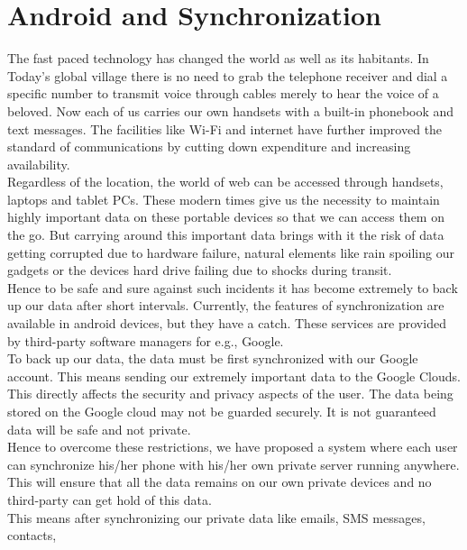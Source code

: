 \section{Android and Synchronization}
\hspace*{0.82cm}The fast paced technology has changed the world as well as its habitants. In Today’s
global village there is no need to grab the telephone receiver and dial a specific number to
transmit voice through cables merely to hear the voice of a beloved. Now each of us carries
our own handsets with a built-in phonebook and text messages. The facilities like Wi-Fi and
internet have further improved the standard of communications by cutting down expenditure
and increasing availability.\\[0.5cm]
\hspace*{0.82cm}Regardless of the location, the world of web can be accessed through handsets,
laptops and tablet PCs. These modern times give us the necessity to maintain highly
important data on these portable devices so that we can access them on the go. But carrying
around this important data brings with it the risk of data getting corrupted due to hardware
failure, natural elements like rain spoiling our gadgets or the devices hard drive failing due to
shocks during transit.\\[0.5cm]
\hspace*{0.82cm}Hence to be safe and sure against such incidents it has become extremely to back up
our data after short intervals. Currently, the features of synchronization are available in
android devices, but they have a catch. These services are provided by third-party software
managers for e.g., Google.\\[0.5cm]
\hspace*{0.82cm}To back up our data, the data must be first synchronized with our Google account.
This means sending our extremely important data to the Google Clouds. This directly affects
the security and privacy aspects of the user. The data being stored on the Google cloud may
not be guarded securely. It is not guaranteed data will be safe and not private.\\[0.5cm]
\hspace*{0.82cm}Hence to overcome these restrictions, we have proposed a system where each user can
synchronize his/her phone with his/her own private server running anywhere. This will
ensure that all the data remains on our own private devices and no third-party can get hold of
this data.\\[0.5cm]
\hspace*{0.82cm}This means after synchronizing our private data like emails, SMS messages, contacts,
